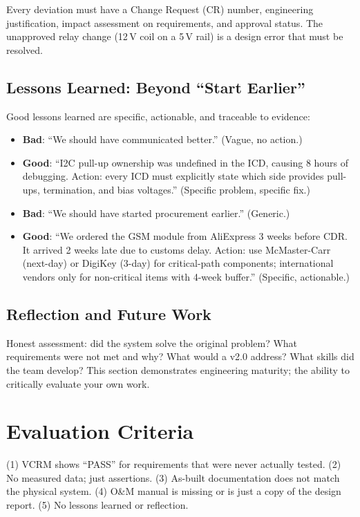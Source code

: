 \documentclass[11pt,letterpaper,twoside,openany]{book}
\begin{document}
Every deviation must have a Change Request (CR) number, engineering justification, impact assessment on requirements, and approval status. The unapproved relay change (12\,V coil on a 5\,V rail) is a design error that must be resolved.

\subsection{Lessons Learned: Beyond ``Start Earlier''}
Good lessons learned are specific, actionable, and traceable to evidence:
\begin{itemize}[nosep,leftmargin=1.5em]
\item \textbf{Bad}: ``We should have communicated better.'' (Vague, no action.)
\item \textbf{Good}: ``I2C pull-up ownership was undefined in the ICD, causing 8 hours of debugging. Action: every ICD must explicitly state which side provides pull-ups, termination, and bias voltages.'' (Specific problem, specific fix.)
\item \textbf{Bad}: ``We should have started procurement earlier.'' (Generic.)
\item \textbf{Good}: ``We ordered the GSM module from AliExpress 3 weeks before CDR. It arrived 2 weeks late due to customs delay. Action: use McMaster-Carr (next-day) or DigiKey (3-day) for critical-path components; international vendors only for non-critical items with 4-week buffer.'' (Specific, actionable.)
\end{itemize}

\subsection{Reflection and Future Work}
Honest assessment: did the system solve the original problem? What requirements were not met and why? What would a v2.0 address? What skills did the team develop? This section demonstrates engineering maturity; the ability to critically evaluate your own work.

\section{Evaluation Criteria}

\begin{tipbox}
(1) VCRM shows ``PASS'' for requirements that were never actually tested. (2) No measured data; just assertions. (3) As-built documentation does not match the physical system. (4) O\&M manual is missing or is just a copy of the design report. (5) No lessons learned or reflection.
\end{tipbox}
\end{document}
